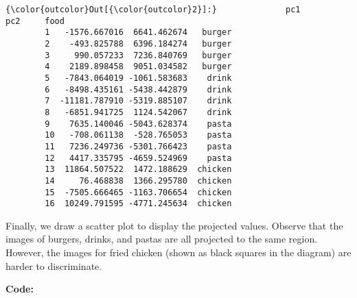 \documentclass[11pt]{article}
\begin{document}
\begin{Verbatim}[commandchars=\\\{\}]
{\color{outcolor}Out[{\color{outcolor}2}]:}              pc1          pc2     food
        1   -1576.667016  6641.462674   burger
        2    -493.825788  6396.184274   burger
        3     990.057233  7236.840769   burger
        4    2189.898458  9051.034582   burger
        5   -7843.064019 -1061.583683    drink
        6   -8498.435161 -5438.442879    drink
        7  -11181.787910 -5319.885107    drink
        8   -6851.941725  1124.542067    drink
        9    7635.140046 -5043.628374    pasta
        10   -708.061138  -528.765053    pasta
        11   7236.249736 -5301.766423    pasta
        12   4417.335795 -4659.524969    pasta
        13  11864.507522  1472.188629  chicken
        14     76.468838  1366.295780  chicken
        15  -7505.666465 -1163.706654  chicken
        16  10249.791595 -4771.245634  chicken
\end{Verbatim}
            
    Finally, we draw a scatter plot to display the projected values. Observe
that the images of burgers, drinks, and pastas are all projected to the
same region. However, the images for fried chicken (shown as black
squares in the diagram) are harder to discriminate.

\textbf{Code:}
\end{document}
